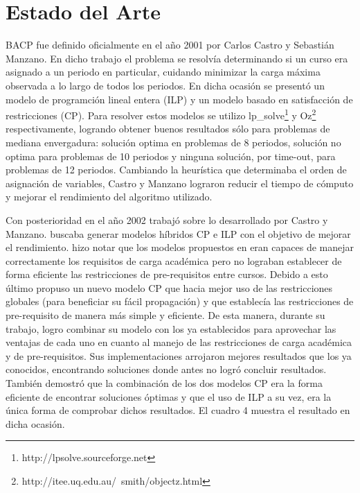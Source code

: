 \documentclass[letter, 10pt]{article}
\begin{document}
\section{Estado del Arte}
BACP fue definido oficialmente en el año 2001 por Carlos Castro y Sebastián
Manzano\cite{castro2001variable}. En dicho trabajo el problema se resolvía
determinando si un curso era asignado a un periodo en particular, cuidando
minimizar la carga máxima observada a lo largo de todos los periodos. En dicha
ocasión se presentó un modelo de programción lineal entera (ILP) y un modelo
basado en satisfacción de restricciones (CP).  Para resolver estos modelos se
utilizo lp\_solve\footnote{http://lpsolve.sourceforge.net} y
Oz\footnote{http://itee.uq.edu.au/~smith/objectz.html} respectivamente,
logrando obtener buenos resultados sólo para problemas de mediana envergadura:
solución optima en problemas de 8 periodos, solución no optima para problemas de
10 periodos y ninguna solución, por time-out, para problemas de 12
periodos. Cambiando la heurística que determinaba el orden de asignación de
variables, Castro y Manzano lograron reducir el tiempo de cómputo y mejorar el
rendimiento del algoritmo utilizado. 

Con posterioridad en el año 2002 \cite{hnich2002modelling} trabajó sobre lo
desarrollado por Castro y Manzano. \cite{hnich2002modelling} buscaba generar
modelos híbridos CP e ILP con el objetivo de mejorar el rendimiento.
\cite{hnich2002modelling} hizo notar que los modelos propuestos en
\cite{castro2001variable} eran capaces de manejar correctamente los requisitos
de carga académica pero no lograban establecer de forma eficiente las
restricciones de pre-requisitos entre cursos. Debido a esto último propuso un
nuevo modelo CP que hacia mejor uso de las restricciones globales (para
beneficiar su fácil propagación) y que establecía las restricciones de
pre-requisito de manera más simple y eficiente.  De esta manera, durante su
trabajo, logro combinar su modelo con los ya establecidos para aprovechar las
ventajas de cada uno en cuanto al manejo de las restricciones de carga académica
y de pre-requisitos. Sus implementaciones arrojaron mejores resultados que los
ya conocidos, encontrando soluciones donde antes \cite{castro2001variable} no
logró concluir resultados. También demostró que la combinación de los dos
modelos CP era la forma eficiente de encontrar soluciones óptimas y que el uso
de ILP a su vez, era la única forma de comprobar dichos resultados. El cuadro 4 muestra el resultado en dicha ocasión.
\end{document}
